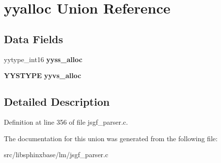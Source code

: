 \section{yyalloc Union Reference}
\label{unionyyalloc}
\subsection*{Data Fields}
\begin{DoxyCompactItemize}
\item 
\mbox{\label{unionyyalloc_a4800e0520a89a4789afa7b5d82197e65}} 
yytype\+\_\+int16 {\bfseries yyss\+\_\+alloc}
\item 
\mbox{\label{unionyyalloc_a9326f4fdc6f737a929444427836d8928}} 
\textbf{ Y\+Y\+S\+T\+Y\+PE} {\bfseries yyvs\+\_\+alloc}
\end{DoxyCompactItemize}


\subsection{Detailed Description}


Definition at line 356 of file jsgf\+\_\+parser.\+c.



The documentation for this union was generated from the following file\+:\begin{DoxyCompactItemize}
\item 
src/libsphinxbase/lm/jsgf\+\_\+parser.\+c\end{DoxyCompactItemize}
